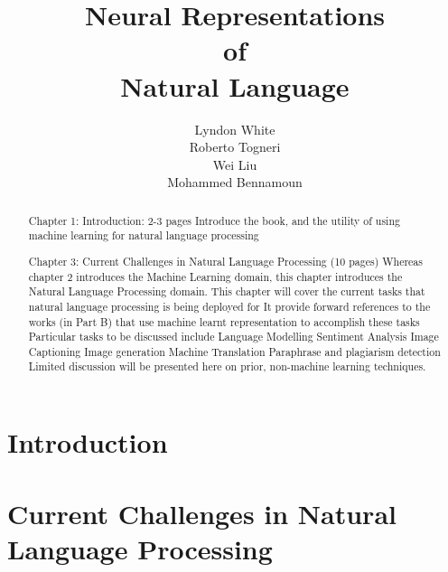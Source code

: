 \documentclass[12pt,parskip]{komatufte}
\begin{document}
\title{Neural Representations \\of\\ Natural Language}
\author{Lyndon White\\ Roberto Togneri\\ Wei Liu\\ Mohammed Bennamoun}
\publishers{SpringerBriefs in Computer Science}

\maketitle
\tableofcontents

\chapter{Introduction}\label{sec:introduction}
\begin{abstract}
	Chapter 1: Introduction: 2-3 pages
Introduce the book, and the utility of using machine learning for natural language processing
\end{abstract}





\chapter{Current Challenges in Natural Language Processing}\label{sec:current-challenges-in-natural-language-processing}
\begin{abstract}
	Chapter 3: Current Challenges in Natural Language Processing (10 pages)
	Whereas chapter 2 introduces the Machine Learning domain, this chapter introduces the Natural Language Processing domain.
	This chapter will cover the current tasks that natural language processing is being deployed for
	It provide forward references to the works (in Part B) that use machine learnt representation to accomplish these tasks
	Particular tasks to be discussed include
	Language Modelling
	Sentiment Analysis
	Image Captioning
	Image generation
	Machine Translation
	Paraphrase and plagiarism detection
	Limited discussion will be presented here on prior, non-machine learning techniques.
\end{abstract}
\end{document}
